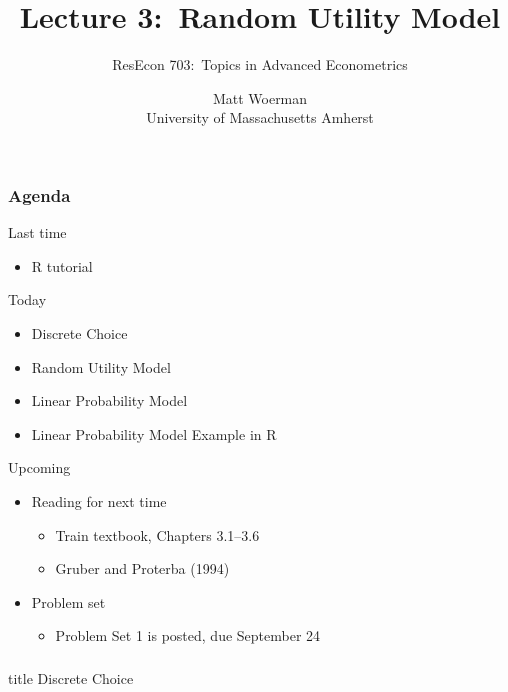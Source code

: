 \documentclass{beamer}
\title[Lecture 3:\ Random Utility Model]{Lecture 3:\ Random Utility Model}
\author[ResEcon 703:\ Advanced Econometrics]{ResEcon 703:\ Topics in Advanced Econometrics}
\date{Matt Woerman\\University of Massachusetts Amherst}
\begin{document}
{ 
\begin{frame}[noframenumbering]
    \titlepage
\end{frame}
}

\begin{frame}\frametitle{Agenda}
    Last time
    \begin{itemize}
        \item R tutorial
    \end{itemize}
    \vspace{2ex}
    Today
    \begin{itemize}
    	\item Discrete Choice
        \item Random Utility Model
        \item Linear Probability Model
        \item Linear Probability Model Example in R
    \end{itemize}
    \vspace{2ex}
    Upcoming
    \begin{itemize}
        \item Reading for next time
        \begin{itemize}
            \item Train textbook, Chapters 3.1--3.6
            \item Gruber and Proterba (1994)
        \end{itemize}
        \item Problem set
        \begin{itemize}
            \item Problem Set 1 is posted, due September 24
        \end{itemize}
    \end{itemize}
\end{frame}

\begin{frame}\frametitle{}
    \vfill
    \centering
    \begin{beamercolorbox}[center]{title}
        \Large Discrete Choice
    \end{beamercolorbox}
    \vfill
\end{frame}
\end{document}
